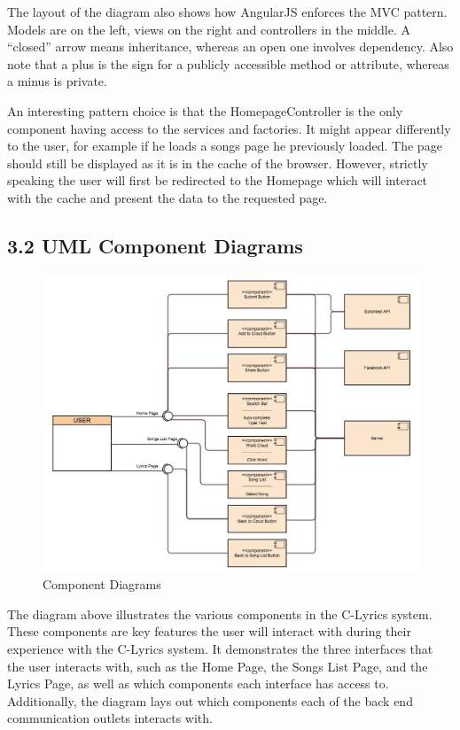 \documentclass[]{article}
\begin{document}
The layout of the diagram also shows how AngularJS enforces the MVC
pattern. Models are on the left, views on the right and controllers in
the middle. A ``closed'' arrow means inheritance, whereas an open one
involves dependency. Also note that a plus is the sign for a publicly
accessible method or attribute, whereas a minus is private.

An interesting pattern choice is that the HomepageController is the only
component having access to the services and factories. It might appear
differently to the user, for example if he loads a songs page he
previously loaded. The page should still be displayed as it is in the
cache of the browser. However, strictly speaking the user will first be
redirected to the Homepage which will interact with the cache and
present the data to the requested page.

\subsection{3.2 UML Component Diagrams}\label{uml-component-diagrams}

\begin{figure}[htbp]
\centering
\includegraphics{component_diagram.jpg}
\caption{Component Diagrams}
\end{figure}

The diagram above illustrates the various components in the C-Lyrics
system. These components are key features the user will interact with
during their experience with the C-Lyrics system. It demonstrates the
three interfaces that the user interacts with, such as the Home Page,
the Songs List Page, and the Lyrics Page, as well as which components
each interface has access to. Additionally, the diagram lays out which
components each of the back end communication outlets interacts with.
\end{document}
